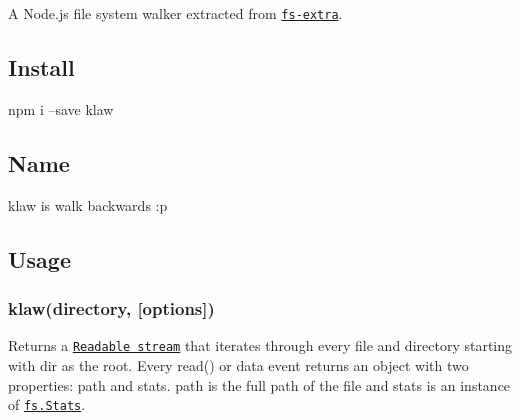 A Node.\+js file system walker extracted from \href{https://github.com/jprichardson/node-fs-extra}{\tt fs-\/extra}.

\href{https://www.npmjs.org/package/klaw}{\tt } \href{http://travis-ci.org/jprichardson/node-klaw}{\tt } \href{https://ci.appveyor.com/project/jprichardson/node-klaw/branch/master}{\tt }

\href{http://standardjs.com}{\tt }

\subsection*{Install }

\begin{DoxyVerb}npm i --save klaw
\end{DoxyVerb}


\subsection*{Name }

{\ttfamily klaw} is {\ttfamily walk} backwards \+:p

\subsection*{Usage }

\subsubsection*{klaw(directory, \mbox{[}options\mbox{]})}

Returns a \href{https://nodejs.org/api/stream.html#stream_class_stream_readable}{\tt Readable stream} that iterates through every file and directory starting with {\ttfamily dir} as the root. Every {\ttfamily read()} or {\ttfamily data} event returns an object with two properties\+: {\ttfamily path} and {\ttfamily stats}. {\ttfamily path} is the full path of the file and {\ttfamily stats} is an instance of \href{https://nodejs.org/api/fs.html#fs_class_fs_stats}{\tt fs.\+Stats}.


